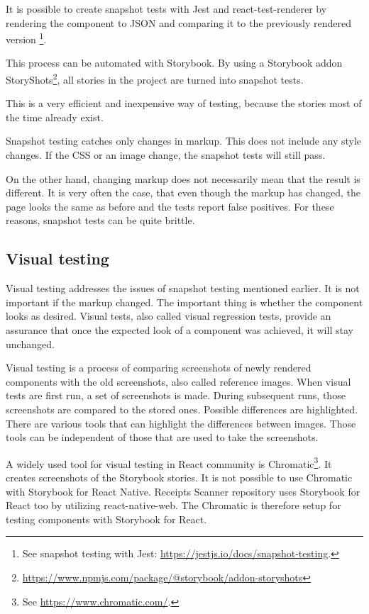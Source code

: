 \documentclass[
  digital, %
  table,   %
  oneside, %
  lof,     %
  lot,     %
]{fithesis3}
\begin{document}
It is possible to create snapshot tests with Jest and react-test-renderer by rendering the component to JSON and comparing it to the previously rendered version \footnote{See snapshot testing with Jest: \url{https://jestjs.io/docs/snapshot-testing}.}.

This process can be automated with Storybook.
By using a Storybook addon StoryShots\footnote{\url{https://www.npmjs.com/package/@storybook/addon-storyshots}}, all stories in the project are turned into snapshot tests. 

This is a very efficient and inexpensive way of testing, because the stories most of the time already exist.

Snapshot testing catches only changes in markup. This does not include any style changes. If the CSS or an image change, the snapshot tests will still pass. 

On the other hand, changing markup does not necessarily mean that the result is different. It is very often the case, that even though the markup has changed, the page looks the same as before and the tests report false positives. For these reasons, snapshot tests can be quite brittle.

\subsection{Visual testing}
\label{sect:visual_testing}
Visual testing addresses the issues of snapshot testing mentioned earlier. It is not important if the markup changed. The important thing is whether the component looks as desired. Visual tests, also called visual regression tests, provide an assurance that once the expected look of a component was achieved, it will stay unchanged.

Visual testing is a process of comparing screenshots of newly rendered components with the old screenshots, also called reference images.
When visual tests are first run, a set of screenshots is made. During subsequent runs, those screenshots are compared to the stored ones. Possible differences are highlighted. There are various tools that can highlight the differences between images. Those tools can be independent of those that are used to take the screenshots.

A widely used tool for visual testing in React community is Chromatic\footnote{See \url{https://www.chromatic.com/}.}. It creates screenshots of the Storybook stories. It is not possible to use Chromatic with Storybook for React Native. Receipts Scanner repository uses Storybook for React too by utilizing react-native-web. The Chromatic is therefore setup for testing components with Storybook for React.
\end{document}
